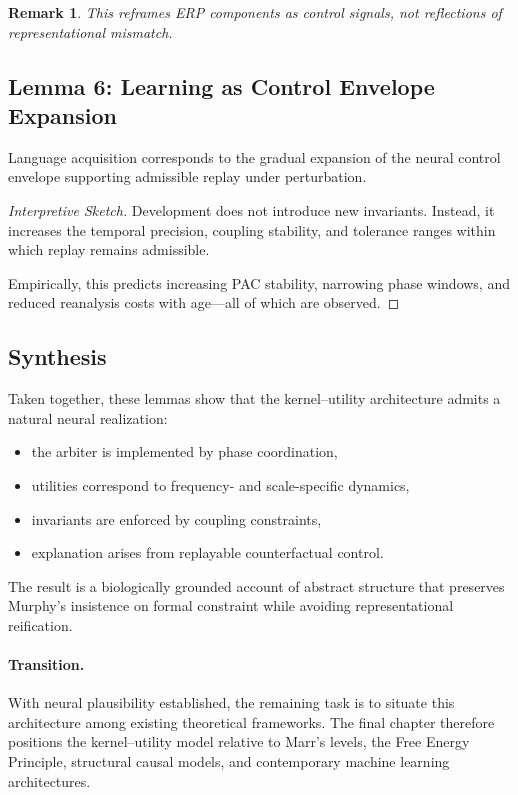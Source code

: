 \documentclass[11pt]{article}
\newtheorem{remark}{Remark}
\begin{document}
\begin{remark}
This reframes ERP components as \emph{control signals}, not reflections of representational mismatch.
\end{remark}

\subsection{Lemma 6: Learning as Control Envelope Expansion}

\begin{lemma}
\label{lem:learning}
Language acquisition corresponds to the gradual expansion of the neural control envelope supporting admissible replay under perturbation.
\end{lemma}

\begin{proof}[Interpretive Sketch]
Development does not introduce new invariants. Instead, it increases the temporal precision, coupling stability, and tolerance ranges within which replay remains admissible.

Empirically, this predicts increasing PAC stability, narrowing phase windows, and reduced reanalysis costs with age—all of which are observed.
\end{proof}

\subsection{Synthesis}

Taken together, these lemmas show that the kernel--utility architecture admits a natural neural realization:

\begin{itemize}
  \item the arbiter is implemented by phase coordination,
  \item utilities correspond to frequency- and scale-specific dynamics,
  \item invariants are enforced by coupling constraints,
  \item explanation arises from replayable counterfactual control.
\end{itemize}

The result is a biologically grounded account of abstract structure that preserves Murphy’s insistence on formal constraint while avoiding representational reification.

\paragraph{Transition.}
With neural plausibility established, the remaining task is to situate this architecture among existing theoretical frameworks. The final chapter therefore positions the kernel--utility model relative to Marr’s levels, the Free Energy Principle, structural causal models, and contemporary machine learning architectures.
\end{document}
